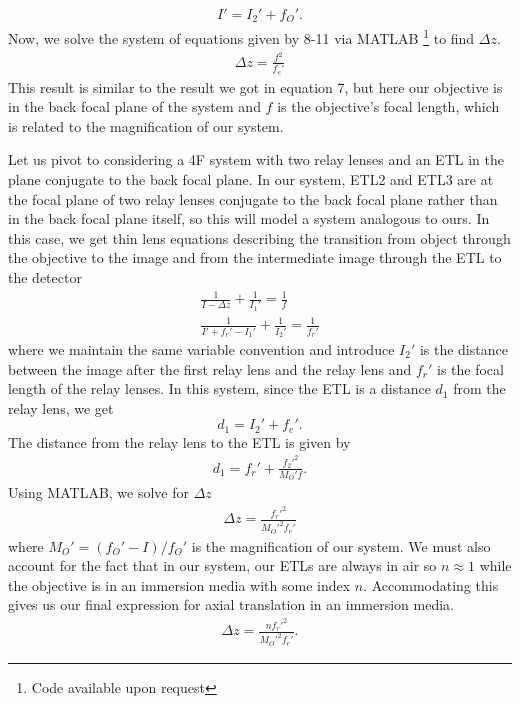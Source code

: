 \begin{gather}
	I' = I_2' + f_O'.
\end{gather}
Now, we solve the system of equations given by 8-11 via MATLAB \footnote{Code available upon request} to find $\Delta z$.
\begin{gather}
	\Delta z = \frac{f^2}{f_e'}
\end{gather}
This result is similar to the result we got in equation 7, but here our objective is in the back focal plane of the system and $f$ is the objective's focal length, which is related to the magnification of our system. 
\par Let us pivot to considering a 4F system with two relay lenses and an ETL in the plane conjugate to the back focal plane. In our system, ETL2 and ETL3 are at the focal plane of two relay lenses conjugate to the back focal plane rather than in the back focal plane itself, so this will model a system analogous to ours. In this case, we get thin lens equations describing the transition from object through the objective to the image and from the intermediate image through the ETL to the detector
\begin{gather}
	\frac{1}{I-\Delta z}+\frac 1{I_1'} = \frac 1{f}\\
	\frac{1}{I' + f_r' - I_1'}+\frac1{I_2'} = \frac{1}{f_r'}
\end{gather}
where we maintain the same variable convention and introduce $I_2'$ is the distance between the image after the first relay lens and the relay lens and $f_r'$ is the focal length of the relay lenses. In this system, since the ETL is a distance $d_1$ from the relay lens, we get 
 \begin{equation}
	d_1 = I_2' + f_e'.
\end{equation}
The distance from the relay lens to the ETL is given by
\begin{gather}
	d_1 = f_r' + \frac{f_2'^2}{M_O' f}.
\end{gather}
Using MATLAB, we solve for $\Delta z$
\begin{gather}
	\Delta z = %
	\frac{f_r'^2}{M_O'^2 f_e'}
\end{gather}
where $M_O' = (f_O'-I)/f_O'$ is the magnification of our system. We must also account for the fact that in our system, our ETLs are always in air so $n\approx 1$ while the objective is in an immersion media with some index $n$. Accommodating this \cite{Fahrbach} gives us our final expression for axial translation in an immersion media.
\begin{gather}
	\Delta z = \frac{nf_r'^2}{M_O'^2 f_e'}.
\end{gather}
